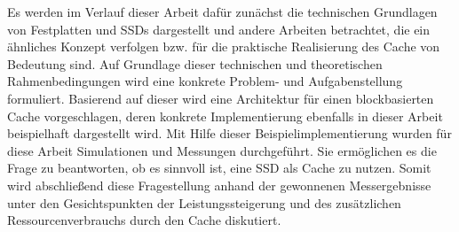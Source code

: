 \documentclass[twoside, 11pt, a4paper]{report}
\begin{document}
\begin{center}
\begin{minipage}{.8\textwidth}
Es werden im Verlauf dieser Arbeit dafür zunächst die technischen Grundlagen von
Festplatten und SSDs dargestellt und andere Arbeiten betrachtet, die ein
ähnliches Konzept verfolgen bzw. für die praktische Realisierung des Cache von
Bedeutung sind. Auf Grundlage dieser technischen und theoretischen
Rahmenbedingungen wird eine konkrete Problem- und Aufgabenstellung formuliert.
Basierend auf dieser wird eine Architektur für einen blockbasierten Cache
vorgeschlagen, deren konkrete Implementierung ebenfalls in dieser Arbeit
beispielhaft dargestellt wird. Mit Hilfe dieser Beispielimplementierung wurden
für diese Arbeit Simulationen und Messungen durchgeführt. Sie ermöglichen es die
Frage zu beantworten, ob es sinnvoll ist, eine SSD als Cache zu nutzen. Somit
wird abschließend diese Fragestellung anhand der gewonnenen Messergebnisse unter
den Gesichtspunkten der Leistungssteigerung und des zusätzlichen
Ressourcenverbrauchs durch den Cache diskutiert.

\end{minipage}
\end{center}
\end{document}
